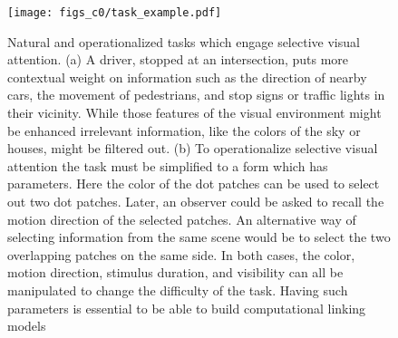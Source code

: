 \begin{figure}[ht]
\centering
\texttt{[image: figs\_c0/task\_example.pdf]}
\caption[Selective visual attention tasks]{Natural and operationalized tasks which engage selective visual attention. (a) A driver, stopped at an intersection, puts more contextual weight on information such as the direction of nearby cars, the movement of pedestrians, and stop signs or traffic lights in their vicinity. While those features of the visual environment might be enhanced irrelevant information, like the colors of the sky or houses, might be filtered out. (b) To operationalize selective visual attention the task must be simplified to a form which has parameters. Here the color of the dot patches can be used to select out two dot patches. Later, an observer could be asked to recall the motion direction of the selected patches. An alternative way of selecting information from the same scene would be to select the two overlapping patches on the same side. In both cases, the color, motion direction, stimulus duration, and visibility can all be manipulated to change the difficulty of the task. Having such parameters is essential to be able to build computational linking models}
\label{fig:c0f1}
\end{figure}

